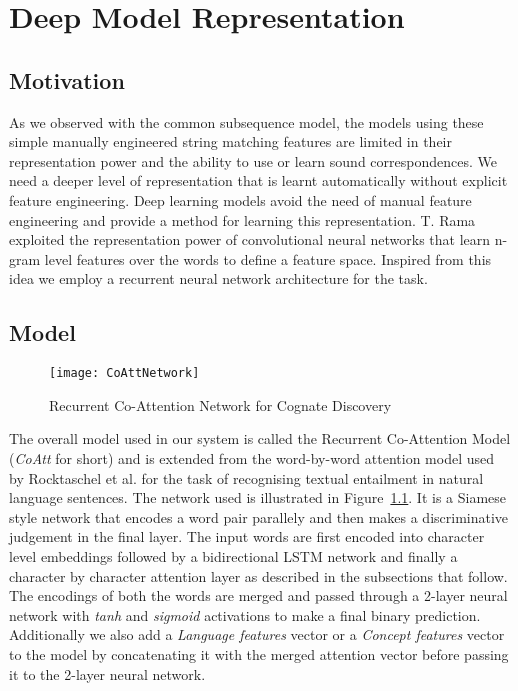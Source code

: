 \chapter{Deep Model Representation}

\section{Motivation}

As we observed with the common subsequence model, the models using these simple manually engineered string matching features are limited in their representation power and the ability to use or learn sound correspondences. We need a deeper level of representation that is learnt automatically without explicit feature engineering.  Deep learning models avoid the need of manual feature engineering and provide a method for learning this representation. T. Rama \cite{rama2016siamese} exploited the representation power of convolutional neural networks that learn n-gram level features over the words to define a feature space. Inspired from this idea we employ a recurrent neural network architecture for the task.

\section{Model}

\begin{figure}[t]
	\centering
	\texttt{[image: CoAttNetwork]}
    \caption{Recurrent Co-Attention Network for Cognate Discovery}
    \label{CoAttNet}
\end{figure}

The overall model used in our system is called the Recurrent Co-Attention Model (\textit{CoAtt} for short) and is extended from the word-by-word attention model used by Rocktaschel et al.\citep{rocktaschel2016reasoning} for the task of recognising textual entailment in natural language sentences. The network used is illustrated in Figure~\ref{CoAttNet}. It is a Siamese style network that encodes a word pair parallely and then makes a discriminative judgement in the final layer. The input words are first encoded into character level embeddings followed by a bidirectional LSTM network and finally a character by character attention layer as described in the subsections that follow. The encodings of both the words are merged and passed through a 2-layer neural network with \textit{tanh} and \textit{sigmoid} activations to make a final binary prediction. Additionally we also add a \textit{Language features} vector or a \textit{Concept features} vector to the model by concatenating it with the merged attention vector before passing it to the 2-layer neural network.

